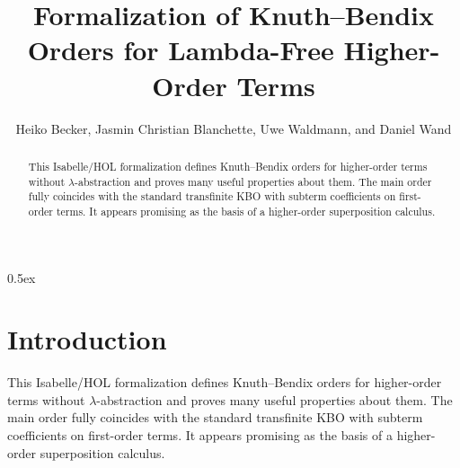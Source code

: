 \documentclass[10pt,a4paper]{article}
\begin{document}
\title{Formalization of Knuth--Bendix Orders for Lambda-Free Higher-Order Terms}
\author{Heiko Becker, Jasmin Christian Blanchette, Uwe Waldmann, and Daniel Wand}

\maketitle

\begin{abstract}
\noindent
This Isabelle/HOL formalization defines Knuth--Bendix orders for higher-order
terms without $\lambda$-ab\-strac\-tion and proves many useful properties about
them. The main order fully coincides with the standard transfinite KBO with
subterm coefficients on first-order terms. It appears promising as the basis
of a higher-order superposition calculus.
\end{abstract}

\tableofcontents

\parindent 0pt
\parskip 0.5ex

\section{Introduction}

This Isabelle/HOL formalization defines Knuth--Bendix orders for higher-order
terms without $\lambda$-abstraction and proves many useful properties about
them. The main order fully coincides with the standard transfinite KBO with
subterm coefficients on first-order terms. It appears promising as the basis
of a higher-order superposition calculus.




%
%

%
%
\end{document}

